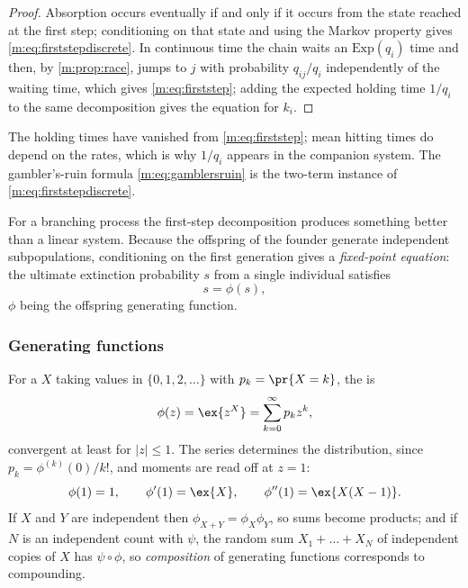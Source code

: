 \begin{proof}
Absorption occurs eventually if and only if it occurs from the state reached at the
first step; conditioning on that state and using the Markov property gives
\cref{m:eq:firststepdiscrete}. In continuous time the chain waits an
$\mathrm{Exp}(q_i)$ time and then, by \cref{m:prop:race}, jumps to $j$ with
probability $q_{ij}/q_i$ independently of the waiting time, which gives
\cref{m:eq:firststep}; adding the expected holding time $1/q_i$ to the same
decomposition gives the equation for $k_i$.
\end{proof}

The holding times have vanished from \cref{m:eq:firststep}; mean hitting times do
depend on the rates, which is why $1/q_i$ appears in the companion system. The
gambler's-ruin formula \cref{m:eq:gamblersruin} is the two-term instance of
\cref{m:eq:firststepdiscrete}.

For a branching process the first-step decomposition produces something better than
a linear system. Because the offspring of the founder generate independent
subpopulations, conditioning on the first generation gives a \emph{fixed-point
equation}: the ultimate extinction probability $s$ from a single individual
satisfies
\begin{equation}
\label{m:eq:extinctionfixedpoint}
s = \phi(s) ,
\end{equation}
$\phi$ being the offspring generating function.

\subsubsection{Generating functions}
\label{m:sec:pgfmethod}

For a \rv{} $X$ taking values in $\{0,1,2,\dots\}$ with $p_k=\pr{X=k}$, the
\pgf{} is
\begin{equation}
\label{m:eq:pgfdef}
\phi(z) = \ex{z^X} = \sum_{k=0}^{\infty}p_kz^k ,
\end{equation}
convergent at least for $|z|\le1$. The series determines the distribution, since
$p_k=\phi^{(k)}(0)/k!$, and moments are read off at $z=1$:
\begin{equation}
\label{m:eq:pgfmoments}
\phi(1)=1,
\qquad
\phi'(1) = \ex{X},
\qquad
\phi''(1) = \ex{X(X-1)} .
\end{equation}
If $X$ and $Y$ are independent then $\phi_{X+Y}=\phi_X\phi_Y$, so sums become
products; and if $N$ is an independent count with \pgf{} $\psi$, the random sum
$X_1+\dots+X_N$ of independent copies of $X$ has \pgf{} $\psi\circ\phi$, so
\emph{composition} of generating functions corresponds to compounding.

